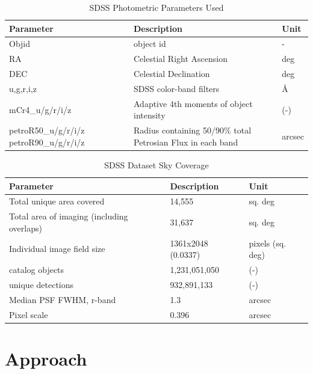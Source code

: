 \documentclass[11pt,sigconf]{acmart}
\begin{document}
\begin{table}[]
  \begin{tabular}{ |p{4.0cm}|p{2.0cm}|p{1.3cm}|  } \hline
   \textbf{Parameter} & \textbf{Description} & \textbf{Unit}  \\ \hline
   Objid & object id  & - \\ \hline
   RA & Celestial Right Ascension & deg \\ \hline
   DEC & Celestial Declination & deg \\ \hline
   u,g,r,i,z & SDSS color-band filters & \AA \\ \hline
   mCr4\_u/g/r/i/z & Adaptive 4th moments of object intensity & (-) \\ \hline
   petroR50\_u/g/r/i/z petroR90\_u/g/r/i/z & Radius containing 50/90\% total Petrosian Flux in each band & arcsec \\ \hline
  \end{tabular}
  \caption{\label{tab:table_IMAGE}SDSS Photometric Parameters Used}
  \end{table}





\begin{table}[]
  \begin{tabular}{ |p{4.0cm}|p{2.0cm}|p{1.3cm}|  } \hline
   \textbf{Parameter} & \textbf{Description} & \textbf{Unit}  \\ \hline
   Total unique area covered & 14,555  & sq. deg \\ \hline
   Total area of imaging (including overlaps) & 31,637 & sq. deg \\ \hline
   Individual image field size & 1361x2048 (0.0337) & pixels (sq. deg) \\ \hline
   catalog objects & 1,231,051,050 & (-) \\ \hline
   unique detections & 932,891,133 & (-) \\ \hline
   Median PSF FWHM, r-band & 1.3 & arcsec \\ \hline
   Pixel scale & 0.396 & arcsec \\ \hline
  \end{tabular}
  \caption{\label{tab:table_SDSS}SDSS Dataset Sky Coverage \cite{abdurro}}
  \end{table}

\section{Approach}
\end{document}
